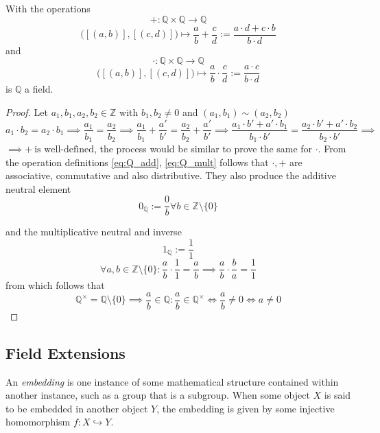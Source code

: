 \begin{proposition}\label{pro:Q_field}
   With the operations
   \[+: \mathbb{Q} \times \mathbb{Q} \to \mathbb{Q}\]
   \begin{equation}\label{eq:Q_add}
      \big([(a, b)], [(c, d)]\big) \mapsto \frac{a}{b} + \frac{c}{d} := \frac{a \cdot d + c \cdot b}{b \cdot d}
   \end{equation}
   and
   \[\cdot: \mathbb{Q} \times \mathbb{Q} \to \mathbb{Q}\]
   \begin{equation}\label{eq:Q_mult}
      \big([(a, b)], [(c, d)]\big) \mapsto \frac{a}{b} \cdot \frac{c}{d} := \frac{a \cdot c}{b \cdot d}
   \end{equation}
   is \(\mathbb{Q}\) a field.
\end{proposition}
\begin{proof}
   Let \(a_1, b_1, a_2, b_2 \in \mathbb{Z}\) with \(b_1, b_2 \neq 0\) and \((a_1, b_1) \sim (a_2, b_2)\)
   \[a_1 \cdot b_2 = a_2 \cdot b_1 \implies \frac{a_1}{b_1} = \frac{a_2}{b_2} \implies \frac{a_1}{b_1} + \frac{a'}{b'} = \frac{a_2}{b_2} + \frac{a'}{b'} \implies \frac{a_1 \cdot b' + a' \cdot b_1}{b_1 \cdot b'} = \frac{a_2 \cdot b' + a' \cdot b_2}{b_2 \cdot b'} \implies\]
   \(\implies +~\text{is well-defined}\), the process would be similar to prove the same for \(\cdot\).
   From the operation definitions \cref{eq:Q_add}, \cref{eq:Q_mult} follows that \(\cdot, +\) are associative, commutative and also distributive.
   They also produce the additive neutral element
   \[0_{\mathbb{Q}} := \frac{0}{b} \forall b \in \mathbb{Z} \setminus \{0\}\]

   and the multiplicative neutral and inverse
   \[1_{\mathbb{Q}} := \frac{1}{1}\]
   \[\forall a, b \in \mathbb{Z} \setminus \{0\}: \frac{a}{b} \cdot \frac{1}{1} = \frac{a}{b} \implies \frac{a}{b} \cdot \frac{b}{a} = \frac{1}{1}\]
   from which follows that
   \[\mathbb{Q}^{\times} = \mathbb{Q} \setminus \{0\} \implies \frac{a}{b} \in \mathbb{Q}: \frac{a}{b} \in \mathbb{Q}^{\times} \iff \frac{a}{b} \neq 0 \iff a \neq 0\]
\end{proof}

\subsection{Field Extensions}
An \emph{embedding} is one instance of some mathematical structure contained within another instance, such as a group that is a subgroup.
When some object \(X\) is said to be embedded in another object \(Y\), the embedding is given by some injective homomorphism \(f: X \hookrightarrow Y\).

